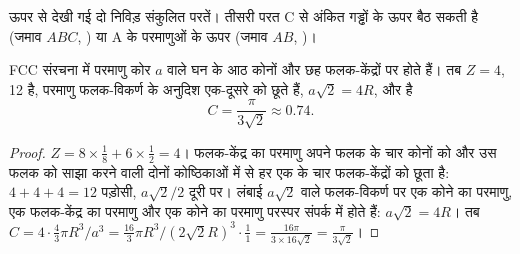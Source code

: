 \begin{omfigure}

{\small ऊपर से देखी गई दो निविड़ संकुलित परतें। तीसरी परत C से अंकित
गड्ढों के ऊपर बैठ सकती है (जमाव $ABC$, ) या
A के परमाणुओं के ऊपर (जमाव $AB$, )।}
\end{omfigure}

\begin{proposition}[फलक-केंद्रित घनीय]\label{prop:b1:crystals-metals:fcc}
FCC संरचना में परमाणु कोर $a$ वाले घन के आठ कोनों और छह फलक-केंद्रों
पर होते हैं। तब $Z = 4$, 
12 है, परमाणु फलक-विकर्ण के अनुदिश एक-दूसरे को छूते हैं, $a\sqrt2 = 4R$, और
 है
\[
  C = \frac{\pi}{3\sqrt2} \approx 0.74 .
\]
\end{proposition}

\begin{proof}
$Z = 8 \times \frac18 + 6 \times \frac12 = 4$। फलक-केंद्र का परमाणु अपने फलक
के चार कोनों को और उस फलक को साझा करने वाली दोनों कोष्ठिकाओं में से हर एक के चार
फलक-केंद्रों को छूता है: $4 + 4 + 4 = 12$ पड़ोसी, $a\sqrt2/2$ दूरी पर। लंबाई $a\sqrt2$ वाले
फलक-विकर्ण पर एक कोने का परमाणु, एक फलक-केंद्र का परमाणु
और एक कोने का परमाणु परस्पर संपर्क में होते हैं: $a\sqrt2 = 4R$। तब
$C = 4 \cdot \frac43\pi R^3/a^3 = \frac{16}{3}\pi R^3/(2\sqrt2 R)^3 \cdot
\frac{1}{1} = \frac{16\pi}{3 \times 16\sqrt2} = \frac{\pi}{3\sqrt2}$।
\end{proof}

